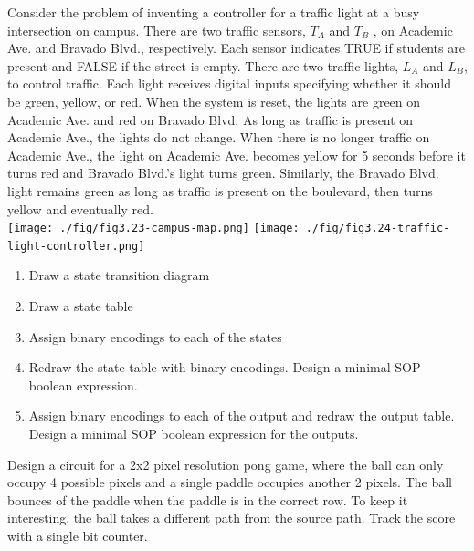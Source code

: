 \begin{example}
  Consider the problem of inventing a controller for a traffic light at a busy
  intersection on campus. There are two traffic
  sensors, $T_A$ and $T_B$ , on Academic Ave. and Bravado Blvd., respectively.
  Each sensor indicates TRUE if students are present and FALSE if the
  street is empty. There are two traffic lights, $L_A$ and $L_B$, to control
  traffic. Each light receives digital inputs specifying whether it should be
  green, yellow, or red.
  When the system is reset, the lights are green on Academic Ave. and red on Bravado Blvd.
  As long as traffic is present on Academic Ave., the lights do not change. When there
  is no longer traffic on Academic Ave., the light on Academic Ave.
  becomes yellow for 5 seconds before it turns red and Bravado Blvd.’s light
  turns green. Similarly, the Bravado Blvd. light remains green as long as
  traffic is present on the boulevard, then turns yellow and eventually red.
  \\
  \texttt{[image: ./fig/fig3.23-campus-map.png]}
  \texttt{[image: ./fig/fig3.24-traffic-light-controller.png]}
  \begin{enumerate}
  \item Draw a state transition diagram
  \item Draw a state table 
  \item Assign binary encodings to each of the states
  \item Redraw the state table with binary encodings. Design a minimal SOP
    boolean expression.
  \item Assign binary encodings to each of the output and redraw the output
    table. Design a minimal SOP boolean expression for the outputs.
  \end{enumerate}
\end{example}


\begin{prob}
  Design a circuit for a 2x2 pixel resolution pong game, where the ball can only
  occupy 4 possible pixels and a single paddle occupies another 2 pixels. The
  ball bounces of the paddle when the paddle is in the correct row. To keep it
  interesting, the ball takes a different path from the source path. Track the
  score with a single bit counter.
\end{prob}
